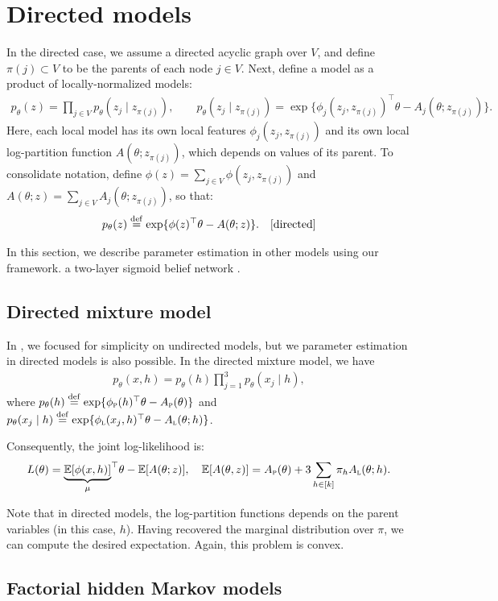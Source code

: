 \appendix

\section{Directed models}
\label{sec:directedModels}

In the directed case, we assume a directed acyclic graph over $V$,
and define $\pi(j) \subset V$ to be the parents of each node $j \in V$.
Next, define a model as a product of locally-normalized models:
\begin{align}
  p_\theta(z) = \prod_{j \in V} p_\theta(z_j \mid z_{\pi(j)}), \quad\quad
  p_\theta(z_j \mid z_{\pi(j)}) = \exp \{ \phi_j(z_j, z_{\pi(j)})^\top\theta - A_j(\theta; z_{\pi(j)}) \}.
\end{align}
Here, each local model has its own local features $\phi_j(z_j, z_{\pi(j)})$
and its own local log-partition function $A(\theta; z_{\pi(j)})$, which depends on values of its parent.
To consolidate notation,
define $\phi(z) = \sum_{j \in V} \phi(z_j, z_{\pi(j)})$
and $A(\theta; z) = \sum_{j \in V} A_j(\theta; z_{\pi(j)})$,
so that:
\begin{align}
  p_\theta(z) \stackrel{\rm def}{=} \exp\{ \phi(z)^\top\theta - A(\theta; z) \}. \quad\text{[directed]}
\end{align}

In this section, we describe parameter estimation in other models using our
framework.
a two-layer sigmoid belief network \cite{saul96sigmoid}.

\subsection{Directed mixture model}

In , we focused for simplicity on
undirected models, but we parameter estimation in directed models is also
possible.
In the directed mixture model, we have
\begin{align}
p_\theta(x,h) = p_\theta(h) \prod_{j=1}^3 p_\theta(x_j \mid h),
\end{align}
where
$p_\theta(h) \stackrel{\rm def}{=} \exp\{\phi_\text{\sc p}(h)^\top\theta - A_\text{\sc p}(\theta)\}$
and
$p_\theta(x_j \mid h) \stackrel{\rm def}{=} \exp\{\phi_\text{\sc l}(x_j, h)^\top\theta - A_\text{\sc l}(\theta; h)\}$.

Consequently, the joint log-likelihood is:
\begin{align}
  L(\theta) = {\underbrace{\mathbb{E}[\phi(x,h)]}_{\mu}}^\top\theta - \mathbb{E}[A(\theta; z)], \quad
  \mathbb{E}[A(\theta, z)] = A_\text{\sc p}(\theta) + 3 \sum_{h \in [k]} \pi_h A_\text{\sc l}(\theta;h).
\end{align}

Note that in directed models, the log-partition functions depends on the parent variables (in this case, $h$).
Having recovered the marginal distribution over $\pi$, we can compute the desired expectation.
Again, this problem is convex.

\subsection{Factorial hidden Markov models}


\cite{ghahramani97fhmm}
